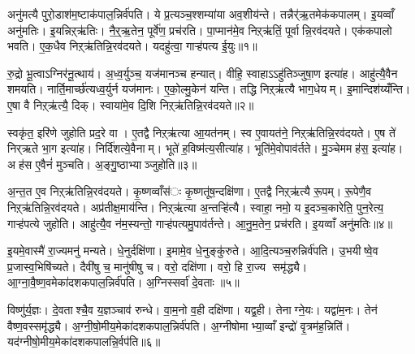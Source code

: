 


अनु॑मत्यै पुरो॒डाश॑म॒ष्टाक॑पाल॒न्निर्व॑पति। ये प्र॒त्यञ्च॒श्शम्या॑या अव॒शीय॑न्ते। तन्नैर्॑ऋ॒तमेक॑कपालम्। इ॒यव्वाँ अनु॑मतिः। इ॒यन्निऱ्ऋ॑तिः। नै॒र्॒ऋ॒तेन॒ पूर्वे॑ण॒ प्रच॑रति। पा॒प्मान॑मे॒व निऱ्ऋ॑तिं॒ पूर्वान्नि॒रव॑दयते। एक॑कपालो भवति। ए॒क॒धैव निऱ्ऋ॑तिन्नि॒रव॑दयते। यदहु॑त्वा॒ गाऱ्ह॑पत्य ई॒युः॥१॥

रु॒द्रो भू॒त्वाऽग्निर॑नू॒त्थाय॑। अ॒ध्व॒र्युञ्च॒ यज॑मानञ्च हन्यात्। वीहि॒ स्वाहाऽऽहु॑तिञ्जुषा॒ण इत्या॑ह। आहु॑त्यै॒वैन शमयति। नार्ति॒मार्च्छ॑त्यध्व॒र्युर्न यज॑मानः। ए॒को॒ल्मु॒केन॑ यन्ति। तद्धि निऱ्ऋ॑त्यै भाग॒धेयम्। इ॒मान्दिश॑य्यँन्ति। ए॒षा वै निऱ्ऋ॑त्यै॒ दिक्। स्वाया॑मे॒व दि॒शि निऱ्ऋ॑तिन्नि॒रव॑दयते॥२॥

स्वकृ॑त॒ इरि॑णे जुहोति प्रद॒रे वा। ए॒तद्वै निऱ्ऋ॑त्या आ॒यत॑नम्। स्व ए॒वायत॑ने॒ निऱ्ऋ॑तिन्नि॒रव॑दयते। ए॒ष ते॑ निर्‌ऋते भा॒ग इत्या॑ह। निर्दि॑शत्ये॒वैनाम्। भूते॑ ह॒विष्म॑त्य॒सीत्या॑ह। भूति॑मे॒वोपाव॑र्तते। मु॒ञ्चेममह॑स॒ इत्या॑ह। अह॑स ए॒वैनं॑ मुञ्चति। अ॒ङ्गु॒ष्ठाभ्याञ्जुहोति॥३॥

अ॒न्त॒त ए॒व निऱ्ऋ॑तिन्नि॒रव॑दयते। कृ॒ष्णव्वाँस॑ः कृ॒ष्णतू॑ष॒न्दक्षि॑णा। ए॒तद्वै निऱ्ऋ॑त्यै रू॒पम्। रू॒पेणै॒व निऱ्ऋ॑तिन्नि॒रव॑दयते। अप्र॑तीक्ष॒माय॑न्ति। निऱ्ऋ॑त्या अ॒न्तऱ्हि॑त्यै। स्वाहा॒ नमो॒ य इ॒दञ्च॒कारेति॒ पुन॒रेत्य॒ गाऱ्ह॑पत्ये जुहोति। आहु॑त्यै॒व न॑म॒स्यन्तो॒ गाऱ्ह॑पत्यमु॒पाव॑र्तन्ते। आ॒नु॒म॒तेन॒ प्रच॑रति। इ॒यव्वाँ अनु॑मतिः॥४॥

इ॒यमे॒वास्मै॑ रा॒ज्यमनु॑ मन्यते। धे॒नुर्दक्षि॑णा। इ॒मामे॒व धे॒नुङ्कु॑रुते। आ॒दि॒त्यञ्च॒रुन्निर्व॑पति। उ॒भयीष्वे॒व प्र॒जास्व॒भिषि॑च्यते। दैवी॑षु च॒ मानु॑षीषु च। वरो॒ दक्षि॑णा। वरो॒ हि रा॒ज्य समृ॑द्ध्यै। आ॒ग्ना॒वै॒ष्ण॒वमेका॑दशकपाल॒न्निर्व॑पति। अ॒ग्निस्सर्वा॑ दे॒वताः॥५॥

विष्णु॑र्य॒ज्ञः। दे॒वताश्चै॒व य॒ज्ञञ्चाव॑ रुन्धे। वा॒म॒नो व॒ही दक्षि॑णा। यद्व॒ही। तेनाग्ने॒यः। यद्वा॑म॒नः। तेन॑ वैष्ण॒वस्समृ॑द्ध्यै। अ॒ग्नी॒षो॒मीय॒मेका॑दशकपाल॒न्निर्व॑पति। अ॒ग्नीषोमाभ्या॒व्वाँ इन्द्रो॑ वृ॒त्रम॑ह॒न्निति॑। यद॑ग्नीषो॒मीय॒मेका॑दशकपालन्नि॒र्वप॑ति॥६॥

